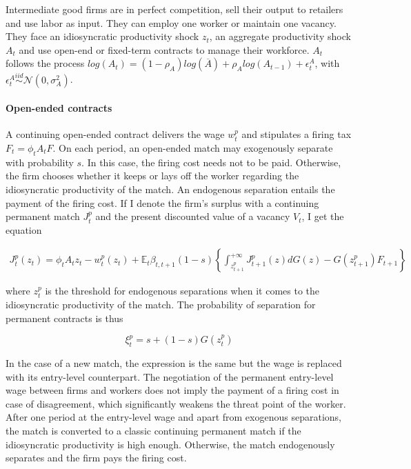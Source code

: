 \documentclass[a4paper]{article}
\begin{document}
Intermediate good firms are in perfect competition, sell their output to retailers and use labor as input. They can employ one worker or maintain one vacancy. They face an idiosyncratic productivity shock $z_t$, an aggregate productivity shock $A_t$ and use open-end or fixed-term contracts to manage their workforce. $A_t$ follows the process $log\left(A_t\right) = (1-\rho_A) log\left(\overline{A}\right) + \rho_A log\left(A_{t-1}\right) + \epsilon_t^A$, with $\epsilon_t^A \overset{iid}{\sim} \mathcal{N} \left( 0, \sigma_A^2 \right)$.

\paragraph{Open-ended contracts} A continuing open-ended contract delivers the wage $w_{t}^{p}$ and stipulates a firing tax $F_t = \phi_t A_t F$. On each period, an open-ended match may exogenously separate with probability $s$. In this case, the firing cost needs not to be paid. Otherwise, the firm chooses whether it keeps or lays off the worker regarding the idiosyncratic productivity of the match. An endogenous separation entails the payment of the firing cost. If I denote the firm's surplus with a continuing permanent match $J_t^p$ and the present discounted value of a vacancy $V_t$, I get the equation

\begin{align*}
J_t^p \left( z_{t} \right) = \phi_t A_t z_{t} - w_{t}^{p} \left( z_t \right) + \mathbb{E}_{t} \beta_{t,t+1} (1-s) \left\{ \int_{z_{t+1}^p}^{+\infty} J_{t+1}^{p} \left( z \right) dG(z) - G\left(z_{t+1}^p\right) F_{t+1} \right\}
\end{align*}

where $z_t^p$ is the threshold for endogenous separations when it comes to the idiosyncratic productivity of the match. The probability of separation for permanent contracts is thus

\begin{equation}
\xi_t^p = s + (1-s) G\left( z_t^p \right) \label{def_xip}
\end{equation}

In the case of a new match, the expression is the same but the wage is replaced with its entry-level counterpart. The negotiation of the permanent entry-level wage between firms and workers does not imply the payment of a firing cost in case of disagreement, which significantly weakens the threat point of the worker. After one period at the entry-level wage and apart from exogenous separations, the match is converted to a classic continuing permanent match if the idiosyncratic productivity is high enough. Otherwise, the match endogenously separates and the firm pays the firing cost.
\end{document}
